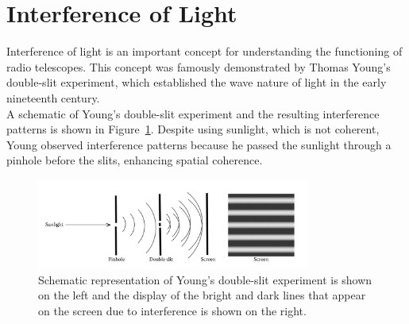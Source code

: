 \section{Interference of Light}

Interference of light is an important concept for understanding the functioning of radio telescopes. This concept was famously demonstrated by Thomas Young's double-slit experiment, which established the wave nature of light in the early nineteenth century. \\


A schematic of Young's double-slit experiment and the resulting interference patterns is shown in Figure~\ref{fig:double_slit}. Despite using sunlight, which is not coherent, Young observed interference patterns because he passed the sunlight through a pinhole before the slits, enhancing spatial coherence. 

\begin{figure}[H]
    \centering
    \includegraphics[width=0.8\textwidth]{Images/double_slit.png} 
    \caption{Schematic representation of Young’s double-slit experiment is shown on the left and the display of the bright and dark lines that appear on the screen due to interference is shown on the right.}
    \label{fig:double_slit}
\end{figure}


